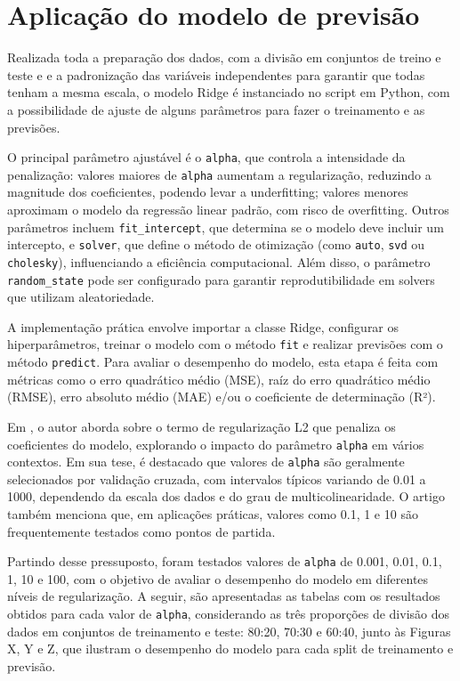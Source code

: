 \section{Aplicação do modelo de previsão}

Realizada toda a preparação dos dados, com a divisão em conjuntos de treino e teste e e a padronização das variáveis independentes para garantir que todas tenham a mesma escala, o modelo Ridge é instanciado no script em Python, com a possibilidade de ajuste de alguns parâmetros para fazer o treinamento e as previsões.

O principal parâmetro ajustável é o \texttt{alpha}, que controla a intensidade da penalização: valores maiores de \texttt{alpha} aumentam a regularização, reduzindo a magnitude dos coeficientes, podendo levar a underfitting; valores menores aproximam o modelo da regressão linear padrão, com risco de overfitting. Outros parâmetros incluem \texttt{fit\_intercept}, que determina se o modelo deve incluir um intercepto, e \texttt{solver}, que define o método de otimização (como \texttt{auto}, \texttt{svd} ou \texttt{cholesky}), influenciando a eficiência computacional. Além disso, o parâmetro \texttt{random\_state} pode ser configurado para garantir reprodutibilidade em solvers que utilizam aleatoriedade.

A implementação prática envolve importar a classe Ridge, configurar os hiperparâmetros, treinar o modelo com o método \texttt{fit} e realizar previsões com o método \texttt{predict}. Para avaliar o desempenho do modelo, esta etapa é feita com métricas como o erro quadrático médio (MSE), raíz do erro quadrático médio (RMSE), erro absoluto médio (MAE) e/ou o coeficiente de determinação (R²).

Em \cite{Hastie01102020}, o autor aborda sobre o termo de regularização L2 que penaliza os coeficientes do modelo, explorando o impacto do parâmetro \texttt{alpha} em vários contextos. Em sua tese, é destacado que valores de \texttt{alpha} são geralmente selecionados por validação cruzada, com intervalos típicos variando de 0.01 a 1000, dependendo da escala dos dados e do grau de multicolinearidade. O artigo também menciona que, em aplicações práticas, valores como 0.1, 1 e 10 são frequentemente testados como pontos de partida.

Partindo desse pressuposto, foram testados valores de \texttt{alpha} de 0.001, 0.01, 0.1, 1, 10 e 100, com o objetivo de avaliar o desempenho do modelo em diferentes níveis de regularização. A seguir, são apresentadas as tabelas com os resultados obtidos para cada valor de \texttt{alpha}, considerando as três proporções de divisão dos dados em conjuntos de treinamento e teste: 80:20, 70:30 e 60:40, junto às Figuras X, Y e Z, que ilustram o desempenho do modelo para cada split de treinamento e previsão.

